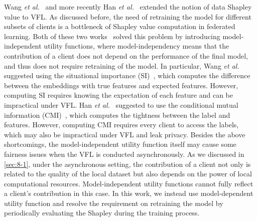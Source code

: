 Wang \textit{et al.}~\cite{wang2019measure} and more recently Han \textit{et al.}~\cite{han2021data} extended the notion of data Shapley value to VFL. As discussed before, the need of retraining the model for different subsets of clients is a bottleneck of Shapley value computation in federated learning. Both of these two works~\cite{wang2019measure,han2021data} solved this problem by introducing model-independent utility functions, where model-independency means that the contribution of a client does not depend on the performance of the final model, and thus does not require retraining of the model. In particular, Wang \textit{et al.}~\cite{wang2019measure} suggested using the situational importance (SI)~\cite{achen1982interpreting}, which computes the difference between the embeddings with true features and expected features. However, computing SI requires knowing the expectation of each feature and can be impractical under VFL. Han \textit{et al.}~\cite{han2021data} suggested to use the conditional mutual information (CMI)~\cite{brown2012conditional}, which computes the tightness between the label and features. However, computing CMI requires every client to access the labels, which may also be impractical under VFL and leak privacy. Besides the above shortcomings, the model-independent utility function itself may cause some fairness issues when the VFL is conducted asynchronously. As we discussed in \autoref{sec:8-1}, under the asynchronous setting, the contribution of a client not only is related to the quality of the local dataset but also depends on the power of local computational resources. Model-independent utility functions cannot fully reflect a client's contribution in this case. In this work, we instead use model-dependent utility function and resolve the requirement on retraining the model by periodically evaluating the Shapley during the training process.

